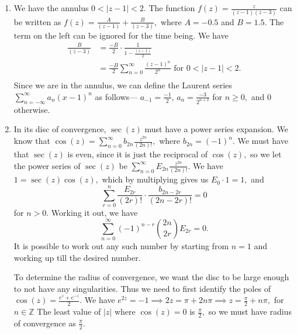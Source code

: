 \documentclass{article}
\begin{document}
\section{} %
\begin{enumerate}
	\item We have the annulus $ 0< |z-1|< 2.$ The function $f(z)=\frac{z}{(z-1)(z-3)}$ can be written as $f(z)=\frac{A}{(z-1)}+ \frac{B}{(z-3)},$ where 
	$A=-0.5$ and $B=1.5.$ The term on the left can be ignored for the time being. We have 
	\begin{align*}
		\frac{B}{(z-3)} &= \frac{-B}{2} \cdot \frac{1}{1- \frac{(z-1)}{2}}\\
		&= \frac{-B}{2} \sum_{n=0}^{\infty} \frac{(z-1)^n}{2^n} \text{ for $0 < |z-1| < 2.$}\\
	\end{align*}
Since we are in the annulus, we can define the Laurent series $\sum_{n=-\infty}^{\infty}a_n(x-1)^n$ as follows--- $a_{-1}= \frac{-1}{2}$, 
$a_n=\frac{-3}{2^{n+2}}$ for $n \geq 0,$ and $0$ otherwise. 
\item In its disc of convergence, $\sec (z)$ must have a power series expansion. We know that $\cos (z)= \sum_{n=0}^{\infty} b_{2n}\frac{z^{2n}}{(2n)!},$ 
where $b_{2n}={(-1)^n}.$ We must have that $\sec(z)$ is even, since it is just the reciprocal of $\cos (z),$ so we let the power series of $\sec(z)$ be 
$\sum_{n=0}^{\infty} E_{2n}\frac{z^{2n}}{(2n)!}.$ We have $1= \sec(z)\cos (z),$ which by multiplying gives us $ E_0 \cdot 1 = 1,$ and $$ \sum_{r=0}^n 
\frac{E_{2r}}{(2r)!}\cdot \frac{b_{2n-2r}}{(2n-2r)!} =0$$ for $n > 0.$ Working it out, we have $$ \sum_{n=0}^{\infty} (-1)^{n-r} \binom{2n}{2r}E_{2r} =0.$$ 
It is possible to work out any such number by starting from $n=1$ and working up till the desired number. 

To determine the radius of convergence, we want the disc to be large enough to not have any singularities. Thus we need to first identify the poles of $\cos 
(z)= \frac{e^{z}+ e^{-z}}{2}.$ We have $e^{2z}=-1 \implies 2z = \pi + 2n\pi  \implies z = \frac{\pi}{2}+ n\pi,$ for $n \in \mathbb{Z}$ The least value of 
$|z|$ where $\cos (z)=0$ 
is $\frac{\pi}{2},$ so we must have radius of convergence as $\frac{\pi}{2}.$ 


\end{enumerate}
\end{document}
